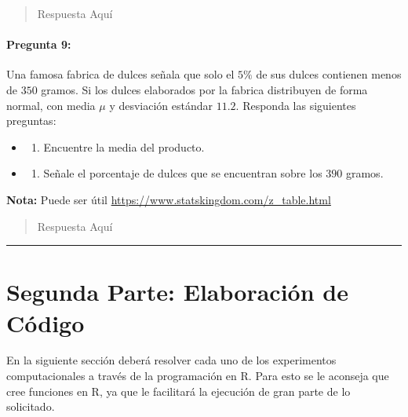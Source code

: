 \documentclass[]{article}
\providecommand{\tightlist}{%
  \setlength{\itemsep}{0pt}\setlength{\parskip}{0pt}}
\let\oldparagraph\paragraph
\renewcommand{\paragraph}[1]{\oldparagraph{#1}\mbox{}}
\begin{document}
\begin{quote}
Respuesta Aquí
\end{quote}

\hypertarget{pregunta-9}{%
\paragraph{\texorpdfstring{\textbf{Pregunta
9:}}{Pregunta 9:}}\label{pregunta-9}}

Una famosa fabrica de dulces señala que solo el \(5\%\) de sus dulces
contienen menos de \(350\) gramos. Si los dulces elaborados por la
fabrica distribuyen de forma normal, con media \(\mu\) y desviación
estándar \(11.2\). Responda las siguientes preguntas:

\begin{itemize}
\item
  \begin{enumerate}
  \def\labelenumi{\alph{enumi})}
  \tightlist
  \item
    Encuentre la media del producto.
  \end{enumerate}
\item
  \begin{enumerate}
  \def\labelenumi{\alph{enumi})}
  \setcounter{enumi}{1}
  \tightlist
  \item
    Señale el porcentaje de dulces que se encuentran sobre los \(390\)
    gramos.
  \end{enumerate}
\end{itemize}

\textbf{Nota:} Puede ser útil
\url{https://www.statskingdom.com/z_table.html}

\begin{quote}
Respuesta Aquí
\end{quote}

\begin{center}\rule{0.5\linewidth}{0.5pt}\end{center}

\hypertarget{segunda-parte-elaboracion-de-codigo}{%
\section{Segunda Parte: Elaboración de
Código}\label{segunda-parte-elaboracion-de-codigo}}

En la siguiente sección deberá resolver cada uno de los experimentos
computacionales a través de la programación en R. Para esto se le
aconseja que cree funciones en R, ya que le facilitará la ejecución de
gran parte de lo solicitado.
\end{document}
